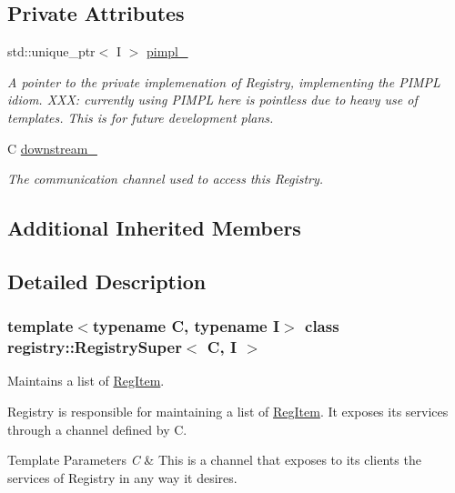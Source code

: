 \subsection*{Private Attributes}
\begin{DoxyCompactItemize}
\item 
std\+::unique\+\_\+ptr$<$ I $>$ \hyperlink{classregistry_1_1RegistrySuper_a0fd137444c6ca161cf7199bf0d25ab3c}{pimpl\+\_\+}
\begin{DoxyCompactList}\small\item\em A pointer to the private implemenation of Registry, implementing the P\+I\+M\+PL idiom. X\+XX\+: currently using P\+I\+M\+PL here is pointless due to heavy use of templates. This is for future development plans. \end{DoxyCompactList}\item 
C \hyperlink{classregistry_1_1RegistrySuper_ab4dfb36336cfcaacaf0ab923e1d53485}{downstream\+\_\+}
\begin{DoxyCompactList}\small\item\em The communication channel used to access this Registry. \end{DoxyCompactList}\end{DoxyCompactItemize}
\subsection*{Additional Inherited Members}


\subsection{Detailed Description}
\subsubsection*{template$<$typename C, typename I$>$\newline
class registry\+::\+Registry\+Super$<$ C, I $>$}

Maintains a list of \hyperlink{classregistry_1_1RegItem}{Reg\+Item}. 

Registry is responsible for maintaining a list of \hyperlink{classregistry_1_1RegItem}{Reg\+Item}. It exposes its services through a channel defined by C.


\begin{DoxyTemplParams}{Template Parameters}
{\em C} & This is a channel that exposes to its clients the services of Registry in any way it desires. \\
\hline
\end{DoxyTemplParams}


